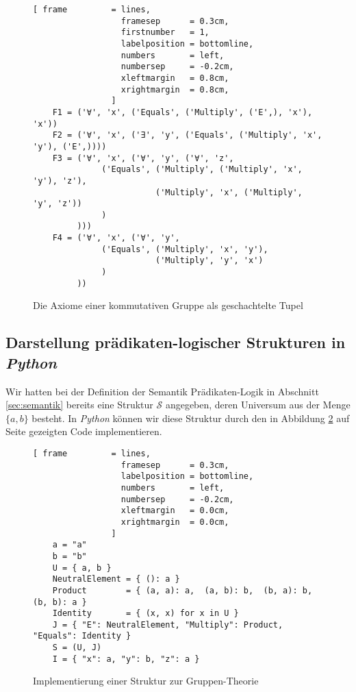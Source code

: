 \begin{figure}[!ht]
\centering
\begin{Verbatim}[ frame         = lines, 
                  framesep      = 0.3cm, 
                  firstnumber   = 1,
                  labelposition = bottomline,
                  numbers       = left,
                  numbersep     = -0.2cm,
                  xleftmargin   = 0.8cm,
                  xrightmargin  = 0.8cm,
                ]
    F1 = ('∀', 'x', ('Equals', ('Multiply', ('E',), 'x'), 'x'))
    F2 = ('∀', 'x', ('∃', 'y', ('Equals', ('Multiply', 'x', 'y'), ('E',))))
    F3 = ('∀', 'x', ('∀', 'y', ('∀', 'z',
              ('Equals', ('Multiply', ('Multiply', 'x', 'y'), 'z'),
                         ('Multiply', 'x', ('Multiply', 'y', 'z'))
              )
         )))
    F4 = ('∀', 'x', ('∀', 'y',
              ('Equals', ('Multiply', 'x', 'y'),
                         ('Multiply', 'y', 'x')
              )
         ))        
\end{Verbatim}
\vspace*{-0.3cm}
\caption{Die Axiome einer kommutativen Gruppe als geschachtelte Tupel}
\label{fig:group-theory-tupel}
\end{figure}

\subsection{Darstellung prädikaten-logischer Strukturen in \textsl{Python}}
Wir hatten bei der Definition der Semantik Prädikaten-Logik in Abschnitt \ref{sec:semantik} bereits eine
Struktur $\mathcal{S}$ angegeben, deren Universum aus der Menge $\{ a, b \}$ besteht.  In \textsl{Python}
können wir diese Struktur durch den in Abbildung \ref{fig:Group.ipynb} auf Seite \pageref{fig:Group.ipynb}
gezeigten Code implementieren. 

\begin{figure}[!ht]
\centering
\begin{Verbatim}[ frame         = lines, 
                  framesep      = 0.3cm, 
                  labelposition = bottomline,
                  numbers       = left,
                  numbersep     = -0.2cm,
                  xleftmargin   = 0.0cm,
                  xrightmargin  = 0.0cm,
                ]
    a = "a"
    b = "b"
    U = { a, b }  
    NeutralElement = { (): a }
    Product        = { (a, a): a,  (a, b): b,  (b, a): b,  (b, b): a }
    Identity       = { (x, x) for x in U }
    J = { "E": NeutralElement, "Multiply": Product, "Equals": Identity }
    S = (U, J)
    I = { "x": a, "y": b, "z": a }
\end{Verbatim}
\vspace*{-0.3cm}
\caption{Implementierung einer Struktur zur Gruppen-Theorie}
\label{fig:Group.ipynb}
\end{figure}


